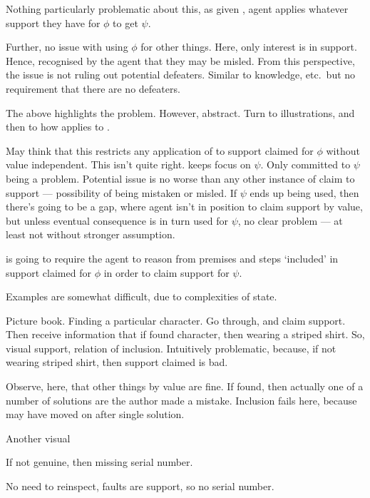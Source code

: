 \begin{note}
  Nothing particularly problematic about this, as given \incl{}, agent applies whatever support they have for \(\phi\) to get \(\psi\).

  Further, no issue with using \(\phi\) for other things.
  Here, only interest is in support.
  Hence, recognised by the agent that they may be misled.
  From this perspective, the issue is not ruling out potential defeaters.
  Similar to knowledge, etc.\ but no requirement that there are no defeaters.
\end{note}

\begin{note}
  The above highlights the problem.
  However, abstract.
  Turn to illustrations, and then to how \nI{} applies to \gsi{}.
\end{note}


\begin{note}
  May think that this restricts any application of \RBV{} to support claimed for \(\phi\) without value independent.
  This isn't quite right.
  \eiS{} keeps focus on \(\psi\).
  Only committed to \(\psi\) being a problem.
  Potential issue is no worse than any other instance of claim to support --- possibility of being mistaken or misled.
  If \(\psi\) ends up being used, then there's going to be a gap, where agent isn't in position to claim support by value, but unless eventual consequence is in turn used for \(\psi\), no clear problem --- at least not without stronger assumption.
\end{note}

\begin{note}
  \uRa{} is going to require the agent to reason from premises and steps `included' in support claimed for \(\phi\) in order to claim support for \(\psi\).
\end{note}


\begin{note}[Examples]
  Examples are somewhat difficult, due to complexities of state.
\end{note}


\begin{note}
  \begin{scenario}
    Picture book.
    Finding a particular character.
    Go through, and claim support.
    Then receive information that if found character, then wearing a striped shirt.
    So, visual support, relation of inclusion.
    Intuitively problematic, because, if not wearing striped shirt, then support claimed is bad.
  \end{scenario}
  Observe, here, that other things by value are fine.
  If found, then actually one of a number of solutions are the author made a mistake.
  Inclusion fails here, because may have moved on after single solution.

  Another visual
  \begin{scenario}
    If not genuine, then missing serial number.
  \end{scenario}
  No need to reinspect, faults are support, so no serial number.
\end{note}

